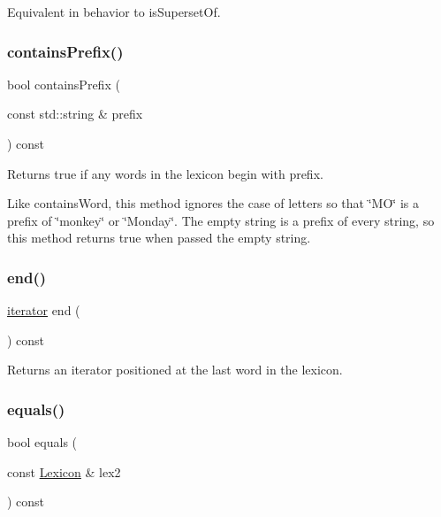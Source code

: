 Equivalent in behavior to is\+Superset\+Of. \mbox{\label{classLexicon_a0b8e0b0b6f72ba6b88b56bd074b1dc32}} 
\subsubsection{\texorpdfstring{contains\+Prefix()}{containsPrefix()}}
{\footnotesize\ttfamily bool contains\+Prefix (\begin{DoxyParamCaption}\item[{const std\+::string \&}]{prefix }\end{DoxyParamCaption}) const}



Returns true if any words in the lexicon begin with {\ttfamily prefix}. 

Like {\ttfamily contains\+Word}, this method ignores the case of letters so that \char`\"{}\+M\+O\char`\"{} is a prefix of \char`\"{}monkey\char`\"{} or \char`\"{}\+Monday\char`\"{}. The empty string is a prefix of every string, so this method returns true when passed the empty string. \mbox{\label{classLexicon_a68b688a51bd0cf6fb5bc2cba292209a8}} 
\subsubsection{\texorpdfstring{end()}{end()}}
{\footnotesize\ttfamily \mbox{\hyperlink{classLexicon_1_1iterator}{iterator}} end (\begin{DoxyParamCaption}{ }\end{DoxyParamCaption}) const\hspace{0.3cm}{\ttfamily [inline]}}



Returns an iterator positioned at the last word in the lexicon. 

\mbox{\label{classLexicon_a7dd6de171cb80bc7e2b48d53bd1e9276}} 
\subsubsection{\texorpdfstring{equals()}{equals()}}
{\footnotesize\ttfamily bool equals (\begin{DoxyParamCaption}\item[{const \mbox{\hyperlink{classLexicon}{Lexicon}} \&}]{lex2 }\end{DoxyParamCaption}) const}



